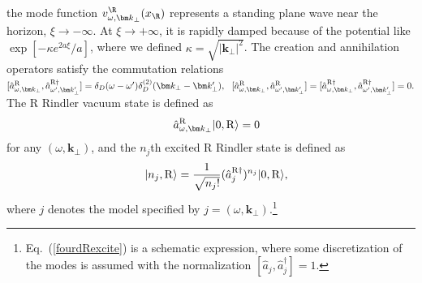 \documentclass[aps,prd,preprintnumbers,nofootinbib,showpacs]{revtex4}%
\begin{document}
\begin{widetext}
the mode function $v_{\omega,{\bm k}_\perp}^\R(x_\R)$ represents 
a standing plane wave near the horizon, $\xi \rightarrow -\infty$. At $\xi \rightarrow +\infty$, 
it is rapidly damped because of the potential like $ \exp[-\kappa e^{2a\xi}/a]$, 
where we defined $\kappa=\sqrt{|\bm k_\perp|^2}$. 
The creation and annihilation operators satisfy the commutation relations
$
[{\hat a}^{\rm R}_{\omega,\bm k_\perp}, {\hat a}_{\omega',\bm k_\perp'}^{\rm R \dagger}]
=\delta_D(\omega-\omega') \delta_D^{(2)}(\bm k_\perp-\bm k_\perp'), 
~~
[{\hat a}^{\rm R}_{\omega,\bm k_\perp}, {\hat a}_{\omega',\bm k_\perp'}^{\rm R}]
=[{\hat a}^{\rm R \dagger}_{\omega,\bm k_\perp}, {\hat a}_{\omega',\bm k_\perp'}^{\rm R \dagger}]
=0.
$
The R Rindler vacuum state is defined as 
\begin{eqnarray}
&&
\hat a_{\omega,\bm k_\perp}^{\rm R} |0,{\rm R}\rangle=0
\label{fourdRvauum}
\end{eqnarray}
for any $(\omega, \bm k_\perp)$, and the $n_j$th excited R Rindler state is defined as 
\begin{eqnarray}
  &&|n_j,{\rm R}\rangle={1\over\sqrt{n_j!}}(\hat a_{j}^{\rm R \dagger})^{n_j}|0,{\rm R}\rangle,
\label{fourdRexcite}
\end{eqnarray}
where $j$ denotes the model specified by $j=(\omega,\bm k_\perp)$.\footnote{
Eq.~(\ref{fourdRexcite}) is a schematic expression, where some discretization of 
the modes is assumed with the normalization $[\hat a_j,\hat a_j^\dagger]=1$.}


\end{widetext}
\end{document}
